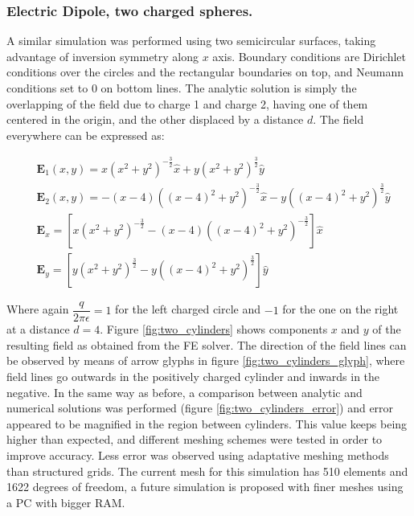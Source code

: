 \subsubsection{Electric Dipole, two charged spheres.}

A similar simulation was performed using two semicircular surfaces, taking advantage of inversion symmetry along $x$ axis. Boundary conditions are Dirichlet conditions over the circles and the rectangular boundaries on top, and Neumann conditions set to 0 on bottom lines.  The analytic solution is simply the overlapping of the field due to charge 1 and charge 2, having one of them centered in the origin, and the other displaced by a distance $d$. The field everywhere can be expressed as: 

\begin{align}
&\mathbf{E}_1(x,y)=x\left(x^2+y^2\right)^{-\frac{3}{2}}\hat{x} + y\left(x^2+y^2\right)^{\frac{3}{2}}\hat{y}\\ 
&\mathbf{E}_2(x,y)=-(x-4)\left((x-4)^2+y^2\right)^{-\frac{3}{2}} \hat{x}-y\left((x-4)^2+y^2\right)^{\frac{3}{2}}\hat{y}\\
&\mathbf{E}_x = \left[ x\left(x^2+y^2\right)^{-\frac{3}{2}} -(x-4)\left((x-4)^2+y^2\right)^{-\frac{3}{2}}\right] \hat{x}\\
&\mathbf{E}_y =\left[ y\left(x^2+y^2\right)^{\frac{3}{2}} -y\left((x-4)^2+y^2\right)^{\frac{3}{2}}\right]\hat{y}
\end{align}

Where again $\dfrac{q}{2\pi \epsilon} = 1$ for the left charged circle and $-1$ for the one on the right at a distance $d=4$. Figure \ref{fig:two_cylinders} shows components $x$ and $y$ of the resulting field as obtained from the FE solver. The direction of the field lines can be observed by means of arrow glyphs in figure \ref{fig:two_cylinders_glyph}, where field lines go outwards in the positively charged cylinder and inwards in the negative.
In the same way as before, a comparison between analytic and numerical solutions was performed (figure \ref{fig:two_cylinders_error}) and error appeared to be magnified in the region between cylinders. This value keeps being higher than expected, and different meshing schemes were tested in order to improve accuracy. Less error was observed using adaptative meshing methods than structured grids. The current mesh for this simulation has 510 elements and 1622 degrees of freedom, a future simulation is proposed with finer meshes using a PC with bigger RAM.

